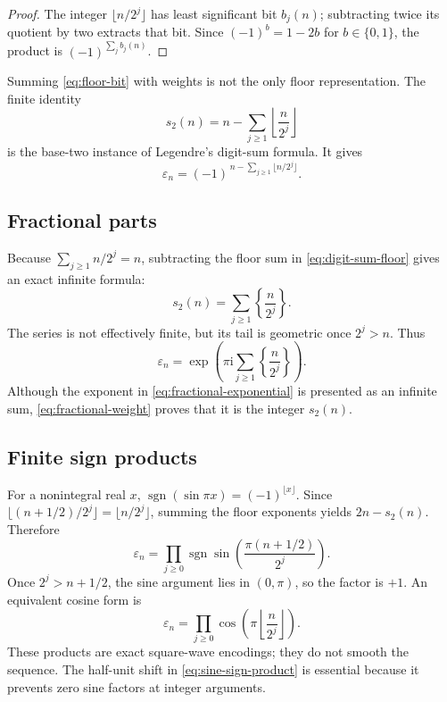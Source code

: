 \documentclass[11pt,oneside]{article}
\theoremstyle{definition}
\theoremstyle{remark}
\newcommand{\ii}{\mathrm i}
\newcommand{\wt}{s_2}
\newcommand{\eps}{\varepsilon}
\newcommand{\sgn}{\operatorname{sgn}}
\begin{document}
\begin{proof}
The integer \(\lfloor n/2^j\rfloor\) has least significant bit \(b_j(n)\); subtracting twice
its quotient by two extracts that bit.  Since \((-1)^b=1-2b\) for \(b\in\{0,1\}\), the
product is \((-1)^{\sum_jb_j(n)}\).
\end{proof}

Summing \eqref{eq:floor-bit} with weights is not the only floor representation.  The finite
identity
\begin{equation}
  \wt(n)=n-\sum_{j\ge1}\left\lfloor\frac{n}{2^j}\right\rfloor                  \label{eq:digit-sum-floor}
\end{equation}
is the base-two instance of Legendre's digit-sum formula.  It gives
\begin{equation}
  \boxed{
  \eps_n=(-1)^{\,n-\sum_{j\ge1}\lfloor n/2^j\rfloor}.}     \label{eq:eps-floor-sum}
\end{equation}

\subsection{Fractional parts}

Because \(\sum_{j\ge1}n/2^j=n\), subtracting the floor sum in
\eqref{eq:digit-sum-floor} gives an exact infinite formula:
\begin{equation}
  \boxed{
  \wt(n)=\sum_{j\ge1}\left\{\frac{n}{2^j}\right\}.}        \label{eq:fractional-weight}
\end{equation}
The series is not effectively finite, but its tail is geometric once \(2^j>n\).  Thus
\begin{equation}
  \eps_n=\exp\!\left(\pi\ii\sum_{j\ge1}\left\{\frac{n}{2^j}\right\}\right).
  \label{eq:fractional-exponential}
\end{equation}
Although the exponent in \eqref{eq:fractional-exponential} is presented as an infinite sum,
\eqref{eq:fractional-weight} proves that it is the integer \(\wt(n)\).

\subsection{Finite sign products}

For a nonintegral real \(x\), \(\sgn(\sin\pi x)=(-1)^{\lfloor x\rfloor}\).  Since
\(\lfloor(n+1/2)/2^j\rfloor=\lfloor n/2^j\rfloor\), summing the floor exponents yields
\(2n-\wt(n)\).  Therefore
\begin{equation}
  \boxed{
  \eps_n=\prod_{j\ge0}
  \sgn\!\sin\!\left(\frac{\pi(n+1/2)}{2^j}\right).}        \label{eq:sine-sign-product}
\end{equation}
Once \(2^j>n+1/2\), the sine argument lies in \((0,\pi)\), so the factor is \(+1\).
An equivalent cosine form is
\begin{equation}
  \boxed{
  \eps_n=\prod_{j\ge0}\cos\!\left(\pi\left\lfloor\frac n{2^j}\right\rfloor\right).}
  \label{eq:floor-cosine-product}
\end{equation}
These products are exact square-wave encodings; they do not smooth the sequence.  The
half-unit shift in \eqref{eq:sine-sign-product} is essential because it prevents zero sine
factors at integer arguments.
\end{document}
